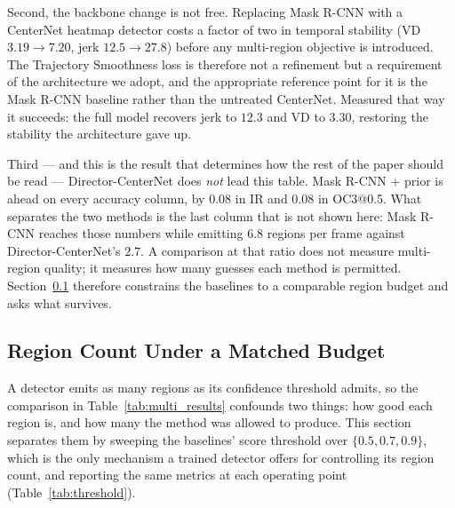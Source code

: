 \documentclass[preprint,12pt]{elsarticle}
\begin{document}
Second, the backbone change is not free. Replacing Mask R-CNN with a CenterNet
heatmap detector costs a factor of two in temporal stability (VD $3.19
\rightarrow 7.20$, jerk $12.5 \rightarrow 27.8$) before any multi-region
objective is introduced. The Trajectory Smoothness loss is therefore not a
refinement but a requirement of the architecture we adopt, and the appropriate
reference point for it is the Mask R-CNN baseline rather than the untreated
CenterNet. Measured that way it succeeds: the full model recovers jerk to
$12.3$ and VD to $3.30$, restoring the stability the architecture gave up.

Third — and this is the result that determines how the rest of the paper should
be read — Director-CenterNet does \emph{not} lead this table. Mask R-CNN +
prior is ahead on every accuracy column, by $0.08$ in IR and $0.08$ in OC3@0.5.
What separates the two methods is the last column that is not shown here:
Mask R-CNN reaches those numbers while emitting $6.8$ regions per frame against
Director-CenterNet's $2.7$. A comparison at that ratio does not measure
multi-region quality; it measures how many guesses each method is permitted.
Section~\ref{subsec:budget} therefore constrains the baselines to a comparable
region budget and asks what survives.

\subsection{Region Count Under a Matched Budget}
\label{subsec:budget}

A detector emits as many regions as its confidence threshold admits, so the
comparison in Table~\ref{tab:multi_results} confounds two things: how good each
region is, and how many the method was allowed to produce. This section
separates them by sweeping the baselines' score threshold over $\{0.5, 0.7,
0.9\}$, which is the only mechanism a trained detector offers for controlling
its region count, and reporting the same metrics at each operating point
(Table~\ref{tab:threshold}).
\end{document}
